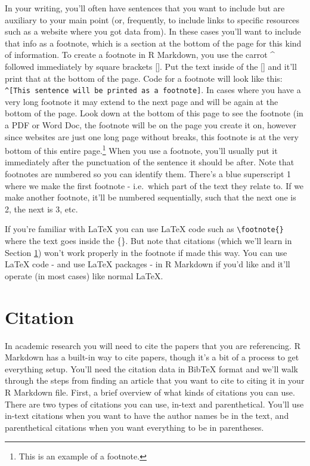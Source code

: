\documentclass[
]{krantz}
\begin{document}
In your writing, you'll often have sentences that you want to include but are auxiliary to your main point (or, frequently, to include links to specific resources such as a website where you got data from). In these cases you'll want to include that info as a footnote, which is a section at the bottom of the page for this kind of information. To create a footnote in R Markdown, you use the carrot \^{} followed immediately by square brackets {[}{]}. Put the text inside of the {[}{]} and it'll print that at the bottom of the page. Code for a footnote will look like this: \texttt{\^{}{[}This\ sentence\ will\ be\ printed\ as\ a\ footnote{]}}. In cases where you have a very long footnote it may extend to the next page and will be again at the bottom of the page. Look down at the bottom of this page to see the footnote (in a PDF or Word Doc, the footnote will be on the page you create it on, however since websites are just one long page without breaks, this footnote is at the very bottom of this entire page.\footnote{This is an example of a footnote.} When you use a footnote, you'll usually put it immediately after the punctuation of the sentence it should be after. Note that footnotes are numbered so you can identify them. There's a blue superscript 1 where we make the first footnote - i.e.~which part of the text they relate to. If we make another footnote, it'll be numbered sequentially, such that the next one is 2, the next is 3, etc.

If you're familiar with LaTeX you can use LaTeX code such as \texttt{\textbackslash{}footnote\{\}} where the text goes inside the \{\}. But note that citations (which we'll learn in Section \ref{citation}) won't work properly in the footnote if made this way. You can use LaTeX code - and use LaTeX packages - in R Markdown if you'd like and it'll operate (in most cases) like normal LaTeX.

\hypertarget{citation}{%
\section{Citation}\label{citation}}

In academic research you will need to cite the papers that you are referencing. R Markdown has a built-in way to cite papers, though it's a bit of a process to get everything setup. You'll need the citation data in BibTeX format and we'll walk through the steps from finding an article that you want to cite to citing it in your R Markdown file. First, a brief overview of what kinds of citations you can use. There are two types of citations you can use, in-text and parenthetical. You'll use in-text citations when you want to have the author names be in the text, and parenthetical citations when you want everything to be in parentheses.
\end{document}
